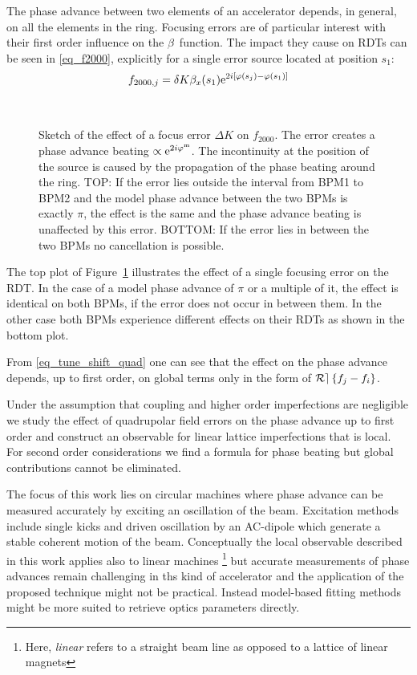 The phase advance between two elements of an accelerator depends, in general, on all the elements in
the ring.
Focusing errors are of particular interest with their first order influence on the $\beta$~function.
The impact they cause on RDTs can be seen in \eqref{eq_f2000}, explicitly for a single error source
located at position $s_1$:
%
\begin{equation}
  f_{2000,j} = \delta K \beta_x(s_1) \text{e}^{2i\left[\varphi(s_j) - \varphi(s_1)\right]}
\end{equation}
%
\begin{figure}
  \centering
  
  \\[1.5em]
  
  \caption{
    Sketch of the effect of a focus error $\Delta K$ on $f_{2000}$.
    The error creates a phase advance beating $\propto \text{e}^{2i\varphi^\text{m}}$.
    The incontinuity at the position of the source is caused by the propagation of the phase
    beating around the ring.
    TOP:
    If the error lies outside the interval from BPM1 to BPM2 and
    the model phase advance between the two BPMs is exactly $\pi$, the effect is the same and the
    phase advance beating is unaffected by this error.
    BOTTOM:
    If the error lies in between the two BPMs no cancellation is possible.
  }
  \label{fig_local_error}
\end{figure}
%
The top plot of Figure~\ref{fig_local_error} illustrates the effect of a single focusing error on the RDT.
In the case of a model phase advance of $\pi$ or a multiple of it, the effect is identical on both
BPMs, if the error does not occur in between them. In the other case both BPMs experience different effects
on their RDTs as shown in the bottom plot.

From \eqref{eq_tune_shift_quad} one can see that the effect on the phase advance depends,
up to first order, on global terms only in the form of $\mathcal{Re} \left\{ f_j - f_i \right\}$.


Under the assumption that coupling and higher order imperfections are negligible we
study the effect of quadrupolar field errors on the phase advance up to first order and construct an observable for
linear lattice imperfections that is local. For second order considerations we find a formula
for phase beating but global contributions cannot be eliminated.

The focus of this work lies on circular machines where phase advance can be measured accurately by
exciting an oscillation of the beam.
Excitation methods include single kicks and driven oscillation by an AC-dipole \cite{Miyamoto2008} which
generate a stable coherent motion of the beam.
Conceptually the local observable described in this work applies also to linear machines%
\footnote{%
Here, \emph{linear} refers to a straight beam line as opposed to a lattice of linear magnets}%
but accurate measurements
of phase advances remain challenging in ths kind of accelerator and the application of the proposed technique might not be practical.
Instead model-based fitting methods \cite{Zhang2018}
might be more suited to retrieve optics parameters directly.

